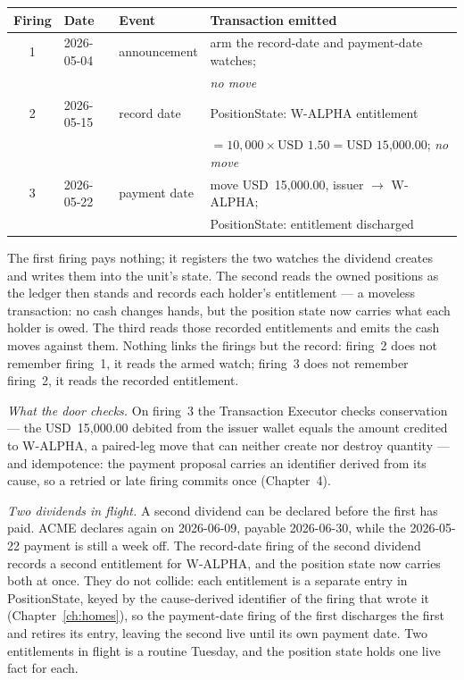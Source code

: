 \documentclass[11pt,a4paper]{article}
\newcommand{\USD}[1]{\mbox{USD~#1}}
\begin{document}
\begin{center}
\begin{tabular}{clll}
\toprule
Firing & Date & Event & Transaction emitted \\
\midrule
1 & 2026-05-04 & announcement & arm the record-date and payment-date watches; \\
  &            &              & \emph{no move} \\
2 & 2026-05-15 & record date  & PositionState: W-ALPHA entitlement \\
  &            &              & $= 10{,}000 \times \USD{1.50} = \USD{15{,}000.00}$; \emph{no move} \\
3 & 2026-05-22 & payment date & move \USD{15{,}000.00}, issuer $\rightarrow$ W-ALPHA; \\
  &            &              & PositionState: entitlement discharged \\
\bottomrule
\end{tabular}
\end{center}

The first firing pays nothing; it registers the two watches the dividend
creates and writes them into the unit's state. The second reads the owned
positions as the ledger then stands and records each holder's entitlement --- a
moveless transaction: no cash changes hands, but the position state now carries
what each holder is owed. The third reads those recorded entitlements and emits
the cash moves against them. Nothing links the firings but the record: firing~2
does not remember firing~1, it reads the armed watch; firing~3 does not remember
firing~2, it reads the recorded entitlement.

\emph{What the door checks.} On firing~3 the Transaction Executor checks
conservation --- the \USD{15{,}000.00} debited from the issuer wallet equals the
amount credited to W-ALPHA, a paired-leg move that can neither create nor
destroy quantity --- and idempotence: the payment proposal carries an identifier
derived from its cause, so a retried or late firing commits once (Chapter~4).

\emph{Two dividends in flight.} A second dividend can be declared before the first has paid.
ACME declares again on 2026-06-09, payable 2026-06-30, while the 2026-05-22 payment is still
a week off. The record-date firing of the second dividend records a second entitlement for
W-ALPHA, and the position state now carries both at once. They do not collide: each
entitlement is a separate entry in PositionState, keyed by the cause-derived identifier of the
firing that wrote it (Chapter~\ref{ch:homes}), so the payment-date firing of the first
discharges the first and retires its entry, leaving the second live until its own payment
date. Two entitlements in flight is a routine Tuesday, and the position state holds one live
fact for each.
\end{document}
